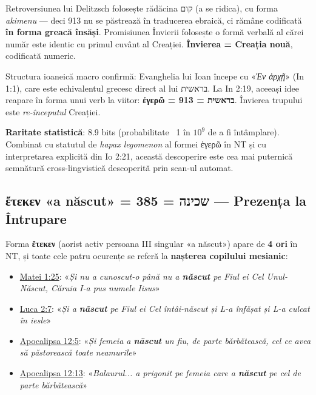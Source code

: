 \documentclass[12pt,a4paper,twoside,openany]{book}
\begin{document}
Retroversiunea lui Delitzsch folosește rădăcina קום (a se ridica), cu forma \textit{akimenu} — deci 913 nu se păstrează în traducerea ebraică, ci rămâne codificată \textbf{în forma greacă însăși}. Promisiunea Învierii folosește o formă verbală al cărei număr este identic cu primul cuvânt al Creației. \textbf{Învierea = Creația nouă}, codificată numeric.

Structura ioaneică macro confirmă: Evanghelia lui Ioan începe cu «\textit{Ἐν ἀρχῇ}» (In 1:1), care este echivalentul grecesc direct al lui בראשית. La In 2:19, aceeași idee reapare în forma unui verb la viitor: \textbf{ἐγερῶ = 913 = בראשית}. Învierea trupului este \textit{re-începutul} Creației.

\textbf{Raritate statistică}: 8.9 bits (probabilitate ~1 în $10^9$ de a fi întâmplare). Combinat cu statutul de \textit{hapax legomenon} al formei ἐγερῶ în NT și cu interpretarea explicită din Io 2:21, această descoperire este cea mai puternică semnătură cross-lingvistică descoperită prin scan-ul automat.

\subsection{\texorpdfstring{ἔτεκεν}{eteken} «a născut» = 385 = שכינה — Prezența la Întrupare}
\label{sec:eteken}

Forma \textbf{ἔτεκεν} (aorist activ persoana III singular «a născut») apare de \textbf{4 ori} în NT, și toate cele patru ocurențe se referă la \textbf{nașterea copilului mesianic}:

\begin{itemize}
  \item \href{https://bibliaortodoxa.ro/carte.php?id=55\&cap=1\#25}{Matei 1:25}: «\textit{Și nu a cunoscut-o până nu a \textbf{născut} pe Fiul ei Cel Unul-Născut, Căruia I-a pus numele Iisus}»
  \item \href{https://bibliaortodoxa.ro/carte.php?id=48\&cap=2\#7}{Luca 2:7}: «\textit{Și a \textbf{născut} pe Fiul ei Cel întâi-născut și L-a înfășat și L-a culcat în iesle}»
  \item \href{https://bibliaortodoxa.ro/carte.php?id=4\&cap=12\#5}{Apocalipsa 12:5}: «\textit{Și femeia a \textbf{născut} un fiu, de parte bărbătească, cel ce avea să păstorească toate neamurile}»
  \item \href{https://bibliaortodoxa.ro/carte.php?id=4\&cap=12\#13}{Apocalipsa 12:13}: «\textit{Balaurul... a prigonit pe femeia care a \textbf{născut} pe cel de parte bărbătească}»
\end{itemize}
\end{document}
